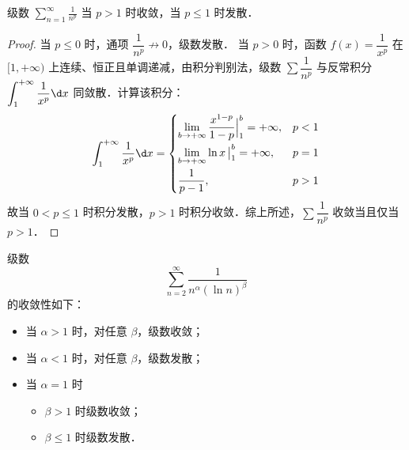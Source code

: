 \documentclass[12pt, a4paper, oneside, UTF8]{ctexbook}
\begin{document}
\begin{corollary}[$p$-级数的敛散性]
    级数 $\displaystyle\sum_{n=1}^\infty \frac{1}{n^p}$ 当 $p > 1$ 时收敛，当 $p \le 1$ 时发散．
\end{corollary}
\begin{proof}
    当 $p \le 0$ 时，通项 $\dfrac{1}{n^p} \not\to 0$，级数发散．
    当 $p > 0$ 时，函数 $f(x) = \dfrac{1}{x^p}$ 在 $[1,+\infty)$ 上连续、恒正且单调递减，由积分判别法，级数 $\sum \dfrac{1}{n^p}$ 与反常积分 $\displaystyle\int_1^{+\infty} \dfrac{1}{x^p}\d x$ 同敛散．计算该积分：
    \[ \int_1^{+\infty} \frac{1}{x^p}\d x = 
        \begin{cases}
            \displaystyle\lim_{b\to+\infty}\frac{x^{1-p}}{1-p}\Big|_1^b = +\infty, & p < 1 \\[8pt]
            \displaystyle\lim_{b\to+\infty}\ln x\,\big|_1^b = +\infty, & p = 1 \\[8pt]
            \displaystyle\frac{1}{p-1}, & p > 1
        \end{cases} \]
    故当 $0 < p \le 1$ 时积分发散，$p > 1$ 时积分收敛．综上所述，$\sum \dfrac{1}{n^p}$ 收敛当且仅当 $p > 1$．
\end{proof}

\begin{corollary}[广义 $p$-级数]
    级数 \[\sum_{n=2}^\infty \frac{1}{n^\alpha (\ln n)^\beta}\] 的收敛性如下：
    \begin{itemize}
        \item 当 $\alpha > 1$ 时，对任意 $\beta$，级数收敛；
        \item 当 $\alpha < 1$ 时，对任意 $\beta$，级数发散；
        \item 当 $\alpha = 1$ 时
            \begin{itemize}
                \item $\beta > 1$ 时级数收敛；
                \item $\beta \le 1$ 时级数发散．
            \end{itemize}
    \end{itemize}
\end{corollary}
\end{document}
